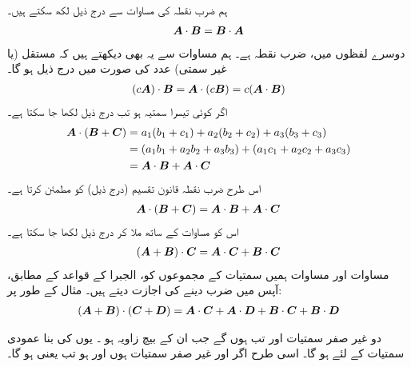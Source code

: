 ہم ضرب نقطہ کی مساوات  سے  درج ذیل لکھ سکتے ہیں۔
\begin{align}\label{مساوات_سمتیہ_قواعد_ضرب_نقطہ_الف}
{\ensuremath{{\boldsymbol{A}}}}\cdot{\ensuremath{{\boldsymbol{B}}}}={{\boldsymbol{B}}}\cdot{\ensuremath{{\boldsymbol{A}}}}
\end{align}
دوسرے لفظوں میں، ضرب نقطہ  ہے۔ ہم مساوات  سے  یہ بھی دیکھتے ہیں کہ مستقل (یا غیر سمتی) عدد  کی صورت میں درج ذیل ہو گا۔
\begin{align}\label{مساوات_سمتیہ_قواعد_ضرب_نقطہ_ب}
(c{{\boldsymbol{A}}})\cdot{\ensuremath{{\boldsymbol{B}}}}={{\boldsymbol{A}}}\cdot(c{{\boldsymbol{B}}})=c({{\boldsymbol{A}}}\cdot{\ensuremath{{\boldsymbol{B}}}})
\end{align}
اگر  کوئی تیسرا سمتیہ ہو تب درج ذیل لکھا جا سکتا ہے۔
\begin{align*}
{\ensuremath{{\boldsymbol{A}}}}\cdot({{\boldsymbol{B}}}+{{\boldsymbol{C}}})&=a_1(b_1+c_1)+a_2(b_2+c_2)+a_3(b_3+c_3)\\
&=(a_1b_1+a_2b_2+a_3b_3)+(a_1c_1+a_2c_2+a_3c_3)\\
&={{\boldsymbol{A}}}\cdot{\ensuremath{{\boldsymbol{B}}}}+{{\boldsymbol{A}}}\cdot{\ensuremath{{\boldsymbol{C}}}}
\end{align*}
اس طرح ضرب نقطہ قانون تقسیم (درج ذیل)  کو مطمئن کرتا ہے۔
\begin{align}\label{مساوات_سمتیہ_قواعد_ضرب_نقطہ_پ}
{\ensuremath{{\boldsymbol{A}}}}\cdot({{\boldsymbol{B}}}+{{\boldsymbol{C}}})={{\boldsymbol{A}}}\cdot{\ensuremath{{\boldsymbol{B}}}}+{{\boldsymbol{A}}}\cdot{\ensuremath{{\boldsymbol{C}}}}
\end{align}
اس کو مساوات  کے ساتھ ملا کر درج ذیل لکھا جا سکتا ہے۔
\begin{align}\label{مساوات_سمتیہ_قواعد_ضرب_نقطہ_ت}
({{\boldsymbol{A}}}+{{\boldsymbol{B}}})\cdot{\ensuremath{{\boldsymbol{C}}}}={{\boldsymbol{A}}}\cdot{\ensuremath{{\boldsymbol{C}}}}+{{\boldsymbol{B}}}\cdot{\ensuremath{{\boldsymbol{C}}}}
\end{align}
مساوات  اور مساوات  ہمیں سمتیات کے مجموعوں کو، الجبرا کے قواعد کے مطابق، آپس میں ضرب دینے کی اجازت دیتے ہیں۔ مثال کے طور پر:
\begin{align}\label{مساوات_سمتیہ_قواعد_ضرب_نقطہ_ٹ}
({{\boldsymbol{A}}}+{{\boldsymbol{B}}})\cdot({{\boldsymbol{C}}}+{{\boldsymbol{D}}})={{\boldsymbol{A}}}\cdot{\ensuremath{{\boldsymbol{C}}}}+{{\boldsymbol{A}}}\cdot{\ensuremath{{\boldsymbol{D}}}}+{{\boldsymbol{B}}}\cdot{\ensuremath{{\boldsymbol{C}}}}+{{\boldsymbol{B}}}\cdot{\ensuremath{{\boldsymbol{D}}}}
\end{align}

دو غیر صفر سمتیات  اور  تب  ہوں گے جب ان  کے بیچ زاویہ  ہو ۔ یوں  کی بنا عمودی سمتیات کے لئے  ہو گا۔ اسی طرح  اگر  اور  غیر صفر سمتیات ہوں اور  ہو تب  یعنی  ہو گا۔

